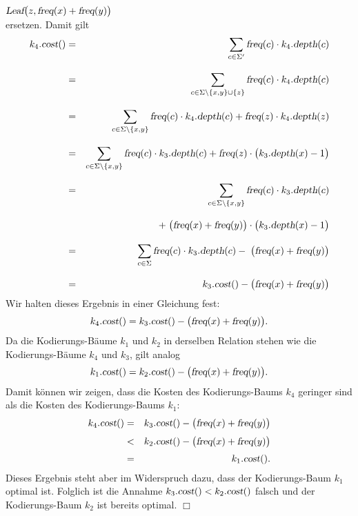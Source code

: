 \begin{enumerate}
  \\[0.2cm]
  \hspace*{1.3cm}
  $\textsl{Leaf}\bigl(z, \textsl{freq}(x) + \textsl{freq}(y)\bigr)$
  \\[0.2cm]
  ersetzen.  Damit gilt
  \begin{eqnarray*}
      k_4.\textsl{cost}() 
  &=& \sum\limits_{c\in\Sigma'} \textsl{freq}(c) \cdot k_4.\textsl{depth}(c) \\[0.3cm]
  &=& \sum\limits_{c\in\Sigma\backslash\{x,y\}\cup\{z\}} \textsl{freq}(c) \cdot k_4.\textsl{depth}(c) 
      \\[0.3cm]
  &=& \sum\limits_{c\in\Sigma\backslash\{x,y\}} \textsl{freq}(c) \cdot k_4.\textsl{depth}(c) 
      +\textsl{freq}(z) \cdot k_4.\textsl{depth}(z) \\[0.3cm]  
  &=& \sum\limits_{c\in\Sigma\backslash\{x,y\}} \textsl{freq}(c) \cdot k_3.\textsl{depth}(c) 
      +\textsl{freq}(z) \cdot \bigl(k_3.\textsl{depth}(x) - 1\bigr) \\[0.3cm]  
  &=& \sum\limits_{c\in\Sigma\backslash\{x,y\}} \textsl{freq}(c) \cdot k_3.\textsl{depth}(c) \\[0.3cm]
  & & +\; \bigl(\textsl{freq}(x) + \textsl{freq}(y)\bigr) \cdot \bigl(k_3.\textsl{depth}(x) - 1\bigr) 
      \\[0.3cm]  
  &=& \sum\limits_{c\in\Sigma} \textsl{freq}(c) \cdot k_3.\textsl{depth}(c) -\; \bigl(\textsl{freq}(x) + \textsl{freq}(y)\bigr)  
      \\[0.3cm]  
  &=& k_3.\textsl{cost}() - \bigl(\textsl{freq}(x) + \textsl{freq}(y)\bigr)  
  \end{eqnarray*}
  Wir halten dieses Ergebnis in einer Gleichung fest:
  \begin{equation}
    \label{eq:huffmanns1}
    k_4.\textsl{cost}() = k_3.\textsl{cost}() - \bigl(\textsl{freq}(x) + \textsl{freq}(y)\bigr).
  \end{equation}
  Da die Kodierungs-B\"aume $k_1$ und $k_2$ in derselben Relation stehen wie die Kodierungs-B\"aume
  $k_4$ und $k_3$, gilt analog
  \begin{equation}
    \label{eq:huffmanns2}
    k_1.\textsl{cost}() = k_2.\textsl{cost}() - \bigl(\textsl{freq}(x) + \textsl{freq}(y)\bigr). 
  \end{equation}
  Damit k\"onnen wir zeigen, dass die Kosten des Kodierungs-Baums $k_4$ geringer sind als die Kosten
  des Kodierungs-Baums $k_1$:
  \begin{eqnarray*}
         k_4.\textsl{cost}() 
   & = & k_3.\textsl{cost}() - \bigl(\textsl{freq}(x) + \textsl{freq}(y)\bigr) \\[0.1cm]
   & < & k_2.\textsl{cost}() - \bigl(\textsl{freq}(x) + \textsl{freq}(y)\bigr) \\[0.1cm] 
   & = & k_1.\textsl{cost}(). 
  \end{eqnarray*}
  Dieses Ergebnis steht aber im Widerspruch dazu, dass der Kodierungs-Baum $k_1$ 
  optimal ist.  Folglich ist die Annahme $k_3.\textsl{cost}() < k_2.\textsl{cost}()$ falsch und der
  Kodierungs-Baum $k_2$ ist bereits optimal.
  \hspace*{\fill} $\Box$
\end{enumerate}


